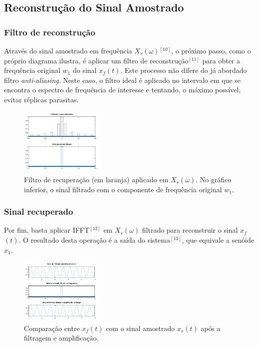 \documentclass[]{IEEEtran}
\begin{document}
\subsection{Reconstrução do Sinal Amostrado}

\subsubsection{Filtro de reconstrução}

Através do sinal amostrado em frequência $X$$_s$$(\omega)$$^{[10]}$, o próximo passo, como o próprio diagrama ilustra, é aplicar um filtro de reconstrução$^{[11]}$ para obter a frequência original $w$$_1$ do sinal $x$$_f$$(t)$. Este processo não difere do já abordado filtro \textit{anti-aliasing}. Neste caso, o filtro ideal é aplicado no intervalo em que se encontra o espectro de frequência de interesse e tentando, o máximo possível, evitar réplicas parasitas.

\begin{figure}[H]
\captionsetup{justification=centering}
\centering %
\includegraphics[width=4cm]{ex_filtrando_amostr.png} %
\caption{Filtro de recuperação (em laranja) aplicado em $X$$_s$$(\omega)$. No gráfico inferior, o sinal filtrado com o componente de frequência original $w$$_1$.}
\end{figure}

\subsubsection{Sinal recuperado}

Por fim, basta aplicar IFFT$^{[12]}$ em $X$$_s$$(\omega)$ filtrado para reconstruir o sinal $x$$_f$$(t)$. O resultado desta operação é a saída do sistema$^{[13]}$, que equivale a senóide $x$$_1$.

\begin{figure}[H]
\captionsetup{justification=centering}
\centering %
\includegraphics[width=4cm]{ex_amplificando_amostr.png} %
\caption{Comparação entre $x$$_f$$(t)$ com o sinal amostrado $x$$_s$$(t)$ após a filtragem e amplificação.}
\end{figure}
\end{document}
